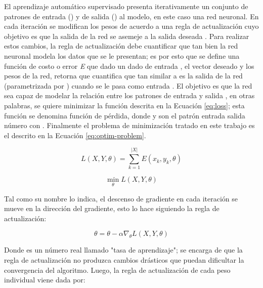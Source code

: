 El aprendizaje automático supervisado presenta iterativamente un conjunto de patrones de entrada () y de salida () al modelo, en este caso una red neuronal. En cada iteración se modifican los pesos \jim{\theta} de acuerdo a una regla de actualización cuyo objetivo es que la salida de la red se asemeje a la salida deseada \cite{Gurney1997}. Para realizar estos cambios, la regla de actualización debe cuantificar que tan bien la red neuronal modela los datos que se le presentan; es por esto que se define una función de costo o error \textit{E} que dado un dado de entrada , el vector deseado  y los pesos \jim{\theta} de la red, retorna  que cuantifica que tan similar a  es la salida de la red (parametrizada por \jim{\theta}) cuando se le pasa como entrada . El objetivo es que la red sea capaz de modelar la relación entre los patrones de entrada  y salida , en otras palabras, se quiere minimizar la función descrita en la Ecuación \ref{eq:loss}; esta función se denomina función de pérdida, donde  y  son el patrón entrada salida número  con . Finalmente el problema de minimización tratado en este trabajo es el descrito en la Ecuación \ref{eq:optim-problem}.

\begin{equation}
    \label{eq:loss}
    L(X, Y, \theta) = \sum_{k = 1}^{|X|} E(x_k, y_k, \theta)
\end{equation}

\begin{equation}
    \label{eq:optim-problem}
    \min_{\theta} L(X, Y, \theta)
\end{equation}

Tal como su nombre lo indica, el descenso de gradiente en cada iteración se mueve en la dirección del gradiente, esto lo hace siguiendo la regla de actualización:

\begin{equation}
    \label{eq:gd-update-rule}
    \theta = \theta - \alpha \nabla_{\theta} L(X, Y, \theta)
\end{equation}

Donde  es un número real llamado "tasa de aprendizaje"; \jim{\alpha} se encarga de que la regla de actualización no produzca cambios drásticos que puedan dificultar la convergencia del algoritmo. Luego, la regla de actualización de cada peso individual  viene dada por:

